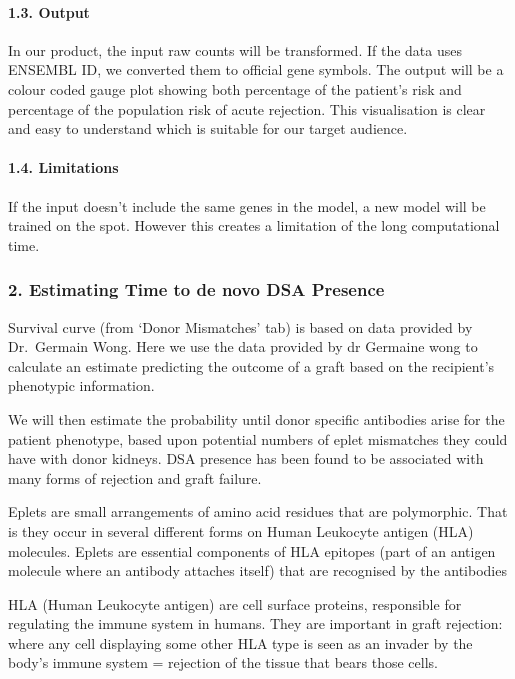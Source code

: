 \documentclass[a4paper,9pt,twocolumn,twoside,]{pinp}
\begin{document}
\hypertarget{output}{%
\paragraph{1.3. Output}\label{output}}

In our product, the input raw counts will be transformed. If the data
uses ENSEMBL ID, we converted them to official gene symbols. The output
will be a colour coded gauge plot showing both percentage of the
patient's risk and percentage of the population risk of acute rejection.
This visualisation is clear and easy to understand which is suitable for
our target audience.

\hypertarget{limitations}{%
\paragraph{1.4. Limitations}\label{limitations}}

If the input doesn't include the same genes in the model, a new model
will be trained on the spot. However this creates a limitation of the
long computational time.

\hypertarget{estimating-time-to-de-novo-dsa-presence}{%
\subsubsection{2. Estimating Time to de novo DSA
Presence}\label{estimating-time-to-de-novo-dsa-presence}}

Survival curve (from `Donor Mismatches' tab) is based on data provided
by Dr.~Germain Wong. Here we use the data provided by dr Germaine wong
to calculate an estimate predicting the outcome of a graft based on the
recipient's phenotypic information.

We will then estimate the probability until donor specific antibodies
arise for the patient phenotype, based upon potential numbers of eplet
mismatches they could have with donor kidneys. DSA presence has been
found to be associated with many forms of rejection and graft failure.

Eplets are small arrangements of amino acid residues that are
polymorphic. That is they occur in several different forms on Human
Leukocyte antigen (HLA) molecules. Eplets are essential components of
HLA epitopes (part of an antigen molecule where an antibody attaches
itself) that are recognised by the antibodies

HLA (Human Leukocyte antigen) are cell surface proteins, responsible for
regulating the immune system in humans. They are important in graft
rejection: where any cell displaying some other HLA type is seen as an
invader by the body's immune system = rejection of the tissue that bears
those cells.
\end{document}
